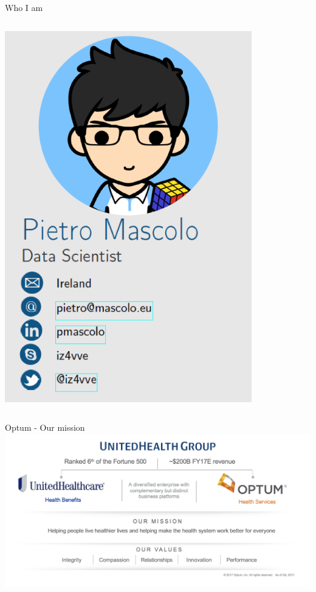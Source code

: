 \documentclass[10pt]{beamer}
\begin{document}
\begin{frame}{Who I am}
\begin{columns}
\begin{flushright}
   			
   				\includegraphics[width=0.83\textwidth]{imgs/me.png}
			\end{flushright}
		\end{columns}
	\end{frame}
	
	
	\begin{frame}{Optum - Our mission}
		\includegraphics[width=\textwidth]{imgs/optum-mission.png}
	\end{frame}
	
\end{document}
